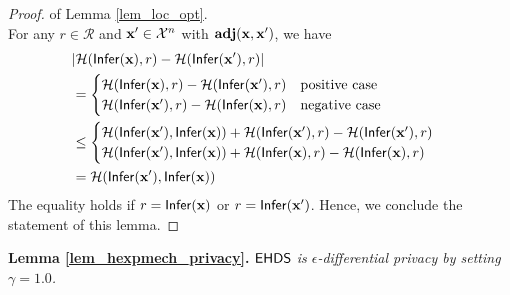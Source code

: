 \documentclass{article}
\begin{document}
\begin{proof} of Lemma \ref{lem_loc_opt}.\\
For any $r \in \mathcal{R}$ and $\textbf{x}' \in \mathcal{X}^n$ with $\textbf{adj}(\textbf{x},\textbf{x}')$, we have
\begin{align*}
&\lvert \mathcal{H}(\mathsf{Infer}(\textbf{x}), r) - \mathcal{H}(\mathsf{Infer}(\textbf{x}'), r)\rvert\\
& = 
\begin{cases}
\mathcal{H}(\mathsf{Infer}(\textbf{x}), r) - \mathcal{H}(\mathsf{Infer}(\textbf{x}'),r) & \text{positive case}\\
\mathcal{H}(\mathsf{Infer}(\textbf{x}'),r) - \mathcal{H}(\mathsf{Infer}(\textbf{x}), r) & \text{negative case}
\end{cases}\\
& \leq 
\begin{cases}
\mathcal{H}(\mathsf{Infer}(\textbf{x}'), \mathsf{Infer}(\textbf{x}))+
\mathcal{H}(\mathsf{Infer}(\textbf{x}'), r) - \mathcal{H}(\mathsf{Infer}(\textbf{x}'),r) & \\
\mathcal{H}(\mathsf{Infer}(\textbf{x}'), \mathsf{Infer}(\textbf{x}))+
\mathcal{H}(\mathsf{Infer}(\textbf{x}), r) - \mathcal{H}(\mathsf{Infer}(\textbf{x}), r)&
\end{cases}\\
&= \mathcal{H}(\mathsf{Infer}(\textbf{x}'), \mathsf{Infer}(\textbf{x}))
\end{align*}
The equality holds if $r = \mathsf{Infer}(\textbf{x})$ or $r = \mathsf{Infer}(\textbf{x}')$.
Hence, we conclude the statement of this lemma.
\end{proof}



\noindent \textbf{ Lemma \ref{lem_hexpmech_privacy}. } 
\emph{
$\mathsf{EHDS}$ is $\epsilon$-differential privacy by setting $\gamma = 1.0$.
}
\end{document}
